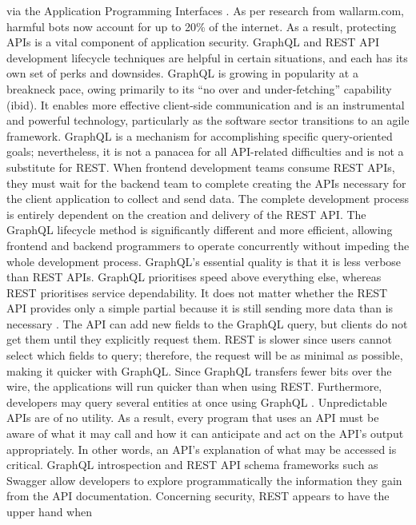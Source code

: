 via the Application Programming Interfaces \citep{
hartigInitialAnalysisFacebook2017}. As per research from wallarm.com, harmful
bots now account for up to 20\% of the internet. As a result, protecting
APIs is a vital component of application security. GraphQL and REST API
development lifecycle techniques are helpful in certain situations, and each has
its own set of perks and downsides. GraphQL is growing in popularity at a
breakneck pace, owing primarily to its ``no over and under-fetching'' capability
(ibid). It enables more effective client-side communication and is an
instrumental and powerful technology, particularly as the software sector
transitions to an agile framework. GraphQL is a mechanism for accomplishing
specific query-oriented goals; nevertheless, it is not a panacea for all
API-related difficulties and is not a substitute for REST. When frontend
development teams consume REST APIs, they must wait for the backend team to
complete creating the APIs necessary for the client application to collect and
send data. The complete development process is entirely dependent on the
creation and delivery of the REST API. The GraphQL lifecycle method is
significantly different and more efficient, allowing frontend and backend
programmers to operate concurrently without impeding the whole development
process. GraphQL's essential quality is that it is less verbose than REST APIs.
GraphQL prioritises speed above everything else, whereas REST prioritises
service dependability. It does not matter whether the REST API provides only a
simple partial because it is still sending more data than is necessary
\citep{vadlamaniCanGraphQLReplace2021}. The API can add new fields to the
GraphQL query, but clients do not get them until they explicitly request them.
REST is slower since users cannot select which fields to query; therefore, the
request will be as minimal as possible, making it quicker with GraphQL. Since
GraphQL transfers fewer bits over the wire, the applications will run quicker
than when using REST. Furthermore, developers may query several entities at
once using GraphQL \citep{lawiEvaluatingGraphQLREST2021}. Unpredictable APIs are
of no utility. As a result, every program that uses an API must be aware of what
it may call and how it can anticipate and act on the API's output appropriately.
In other words, an API's explanation of what may be accessed is critical.
GraphQL introspection and REST API schema frameworks such as Swagger allow
developers to explore programmatically the information they gain from the API
documentation. Concerning security, REST appears to have the upper hand when
